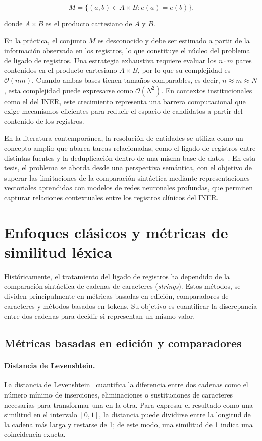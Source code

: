 \[
M=\{(a,b)\in A\times B : e(a)=e(b)\}.
\]

\noindent donde $A\times B$ es el producto cartesiano de $A$ y $B$.

En la práctica, el conjunto $M$ es desconocido y debe ser estimado a partir de la información observada en los registros, lo que constituye el núcleo del problema de ligado de registros.
Una estrategia exhaustiva requiere evaluar los $n\cdot m$ pares contenidos en el producto cartesiano $A\times B$, por lo que su complejidad es $\mathcal{O}(nm)$. Cuando ambas bases tienen tamaños comparables, es decir, $n\approx m\approx N$, esta complejidad puede expresarse como $\mathcal{O}(N^2)$. En contextos institucionales como el del INER, este crecimiento representa una barrera computacional que exige mecanismos eficientes para reducir el espacio de candidatos a partir del contenido de los registros.

En la literatura contemporánea, la resolución de entidades se utiliza como un concepto amplio que abarca tareas relacionadas, como el ligado de registros entre distintas fuentes y la deduplicación dentro de una misma base de datos~\cite{christen2012}. En esta tesis, el problema se aborda desde una perspectiva semántica, con el objetivo de superar las limitaciones de la comparación sintáctica mediante representaciones vectoriales aprendidas con modelos de redes neuronales profundas, que permiten capturar relaciones contextuales entre los registros clínicos del INER.

%
\section{Enfoques clásicos y métricas de similitud léxica}

Históricamente, el tratamiento del ligado de registros ha dependido de la comparación sintáctica de cadenas de caracteres (\textit{strings}). Estos métodos, se dividen principalmente en métricas basadas en edición, comparadores de caracteres y métodos basados en tokens. Su objetivo es cuantificar la discrepancia entre dos cadenas para decidir si representan un mismo valor.

\subsection{Métricas basadas en edición y comparadores}

\paragraph{Distancia de Levenshtein.}
La distancia de Levenshtein~\cite{levenshtein1966} cuantifica la diferencia entre dos cadenas como el número mínimo de inserciones, eliminaciones o sustituciones de caracteres necesarias para transformar una en la otra. Para expresar el resultado como una similitud en el intervalo $[0,1]$, la distancia puede dividirse entre la longitud de la cadena más larga y restarse de 1; de este modo, una similitud de 1 indica una coincidencia exacta.

